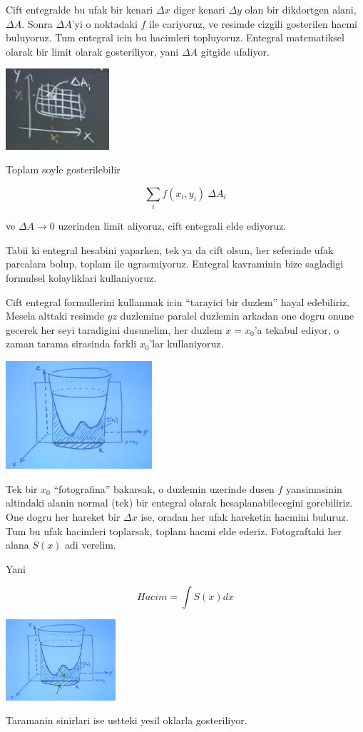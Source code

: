 \documentclass[12pt,fleqn]{article}
\begin{document}
Cift entegralde bu ufak bir kenari $\Delta x$ diger kenari $\Delta y$ olan
bir dikdortgen alani, $\Delta A$. Sonra $\Delta A$'yi o noktadaki $f$ ile
cariyoruz, ve resimde cizgili gosterilen hacmi buluyoruz. Tum entegral icin
bu hacimleri topluyoruz. Entegral matematiksel olarak bir limit olarak
gosteriliyor, yani $\Delta A$ gitgide ufaliyor. 

\includegraphics[height=3cm]{16_4.png}

Toplam soyle gosterilebilir

\[ \sum_i f(x_i,y_i) \ \Delta A_i \]

ve $\Delta A \to 0$ uzerinden limit aliyoruz, cift entegrali elde ediyoruz. 

Tabii ki entegral hesabini yaparken, tek ya da cift olsun, her seferinde
ufak parcalara bolup, toplam ile ugrasmiyoruz. Entegral kavraminin bize
sagladigi formulsel kolayliklari kullaniyoruz.

Cift entegral formullerini kullanmak icin ``tarayici bir duzlem'' hayal
edebiliriz. Mesela alttaki resimde $yz$ duzlemine paralel duzlemin arkadan
one dogru onune gecerek her seyi taradigini dusunelim, her duzlem $x=x_0$'a
tekabul ediyor, o zaman tarama sirasinda farkli $x_0$'lar kullaniyoruz. 

\includegraphics[height=4cm]{16_5.png}

Tek bir $x_0$ ``fotografina'' bakarsak, o duzlemin uzerinde dusen $f$
yansimasinin altindaki alanin normal (tek) bir entegral olarak
hesaplanabilecegini gorebiliriz. One dogru her hareket bir $\Delta x$ ise,
oradan her ufak hareketin hacmini buluruz. Tum bu ufak hacimleri toplarsak,
toplam hacmi elde ederiz. Fotograftaki her alana $S(x)$ adi verelim.

Yani 

\[ Hacim = \int S(x) dx \]

\includegraphics[height=3cm]{16_6.png}

Taramanin sinirlari ise ustteki yesil oklarla gosteriliyor. 
\end{document}
